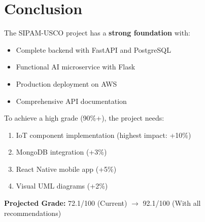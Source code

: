 \documentclass[12pt,a4paper]{article}
\begin{document}
\section{Conclusion}

The SIPAM-USCO project has a \textbf{strong foundation} with:
\begin{itemize}
    \item Complete backend with FastAPI and PostgreSQL
    \item Functional AI microservice with Flask
    \item Production deployment on AWS
    \item Comprehensive API documentation
\end{itemize}

To achieve a high grade (90\%+), the project needs:
\begin{enumerate}
    \item IoT component implementation (highest impact: +10\%)
    \item MongoDB integration (+3\%)
    \item React Native mobile app (+5\%)
    \item Visual UML diagrams (+2\%)
\end{enumerate}

\textbf{Projected Grade:} 72.1/100 (Current) $\rightarrow$ 92.1/100 (With all recommendations)
\end{document}

